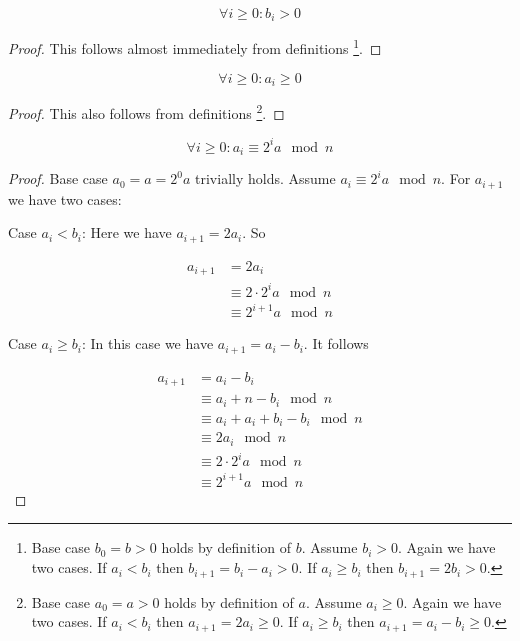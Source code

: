 \begin{thminv}\label{p2}
$$
  \forall i \geq 0: b_i > 0
$$
\end{thminv}

\begin{proof}
This follows almost immediately from definitions \footnote{
Base case $b_0 = b > 0$ holds by definition of $b$. Assume $b_i > 0$. Again we have two cases. If $a_i < b_i$ then $b_{i+1} = b_i - a_i > 0$. 
If $a_i \geq b_i$ then $b_{i+1} = 2 b_i > 0$.
}.

\end{proof}

\begin{thminv}\label{p3}
$$
  \forall i \geq 0: a_i \geq 0
$$
\end{thminv}

\begin{proof}
This also follows from definitions \footnote{
Base case $a_0 = a > 0$ holds by definition of $a$. Assume $a_i \geq 0$. Again we have two cases. If $a_i < b_i$ then $a_{i+1} = 2 a_i \geq 0$. 
If $a_i \geq b_i$ then $a_{i+1} = a_i - b_i \geq 0$.
}.

\end{proof}


\begin{thminv}\label{p4}
$$
  \forall i \geq 0: a_i \equiv 2^i a \mod n
$$
\end{thminv}

\begin{proof}
Base case $a_0 = a = 2^0 a$ trivially holds.
Assume $a_i \equiv 2^i a \mod n$. For $a_{i+1}$ we have two cases:

Case $a_i < b_i$: Here we have $a_{i+1} = 2 a_i$. So

\begin{align*}
  a_{i+1} &= 2 a_i \\
  &\equiv 2 \cdot 2^i a \mod n \\
  &\equiv 2^{i+1} a \mod n
\end{align*}

Case $a_i \geq b_i$: In this case we have  $a_{i+1} = a_i - b_i$. It follows

\begin{align*}
  a_{i+1} &= a_i - b_i \\
  &\equiv a_i + n - b_i \mod n \\
  &\equiv a_i + a_i + b_i - b_i \mod n \\
  &\equiv 2 a_i \mod n \\
  &\equiv 2 \cdot 2^i a \mod n \\
  &\equiv 2^{i+1} a \mod n  
\end{align*}

\end{proof}

